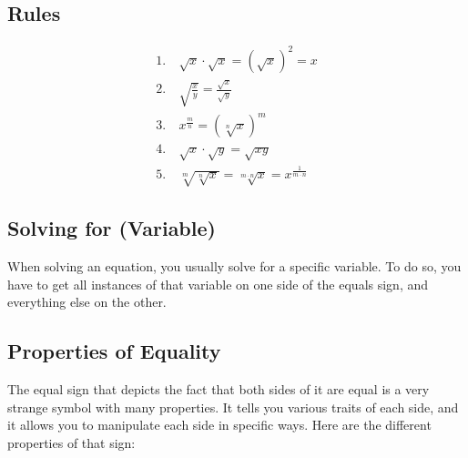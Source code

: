 \subsection{Rules}
\label{sss:rule-a4f8}




\begin{align}
1.\ & \sqrt{x} \cdot \sqrt{x} = (\sqrt{x})^2 = x \\2.\ & \sqrt{\frac{x}{y}} = \frac{\sqrt{x}}{\sqrt{y}} \\3.\ & x^{\frac{m}{n}} = (\sqrt[n]{x})^m \\4.\ & \sqrt{x} \cdot \sqrt{y} = \sqrt{xy} \\5.\ & \sqrt[m]{\sqrt[n]{x}} = \sqrt[m \cdot n]{x} = x^{\frac{1}{m \cdot n}}
\end{align}






\subsection{Solving for (Variable)}
\label{sss:solv-f2b4}




When solving an equation, you usually solve for a specific variable. To do so, you have to
get all instances of that variable on one side of the equals sign, and everything else on
the other.




\subsection{Properties of Equality}
\label{sss:prop-ce90}




The equal sign that depicts the fact that both sides of it are equal is a very strange
symbol with many properties. It tells you various traits of each side, and it allows you
to manipulate each side in specific ways. Here are the different properties of that sign:



